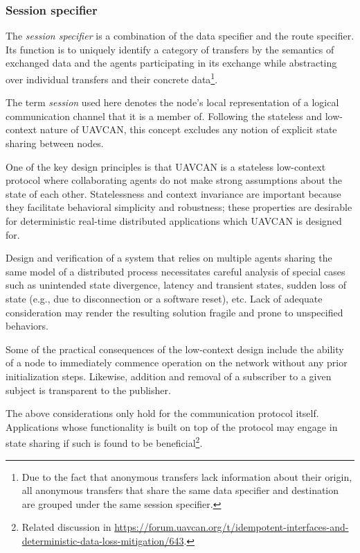 \subsubsection{Session specifier}\label{sec:transport_session_specifier}

The \emph{session specifier} is a combination of the data specifier and the route specifier.
Its function is to uniquely identify a category of transfers by the semantics of exchanged data and
the agents participating in its exchange while abstracting over individual transfers and their concrete data\footnote{%
    Due to the fact that anonymous transfers lack information about their origin,
    all anonymous transfers that share the same data specifier and destination
    are grouped under the same session specifier.
}.

The term \emph{session} used here denotes the node's local representation of a logical communication
channel that it is a member of.
Following the stateless and low-context nature of UAVCAN, this concept excludes any notion of explicit state sharing
between nodes.

\begin{remark}[breakable]
    One of the key design principles is that UAVCAN is a stateless low-context protocol where collaborating agents
    do not make strong assumptions about the state of each other.
    Statelessness and context invariance are important because they facilitate behavioral simplicity and robustness;
    these properties are desirable for deterministic real-time distributed applications which UAVCAN is designed for.

    Design and verification of a system that relies on multiple agents sharing the same model of a distributed process
    necessitates careful analysis of special cases such as unintended state divergence, latency and transient states,
    sudden loss of state (e.g., due to disconnection or a software reset), etc.
    Lack of adequate consideration may render the resulting solution fragile and prone to unspecified behaviors.

    Some of the practical consequences of the low-context design include the ability of a node to immediately
    commence operation on the network without any prior initialization steps.
    Likewise, addition and removal of a subscriber to a given subject is transparent to the publisher.

    The above considerations only hold for the communication protocol itself.
    Applications whose functionality is built on top of the protocol may engage in state sharing if such is
    found to be beneficial\footnote{%
        Related discussion in
        \url{https://forum.uavcan.org/t/idempotent-interfaces-and-deterministic-data-loss-mitigation/643}.
    }.
\end{remark}

